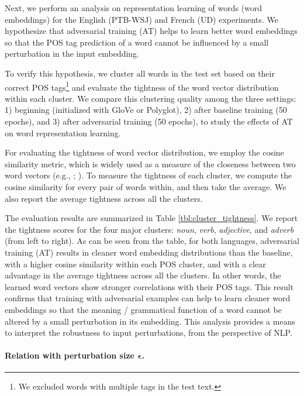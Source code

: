 \documentclass[11pt,a4paper]{article}
\begin{document}
Next, we perform an analysis on representation learning of words (word embeddings) for the English (PTB-WSJ) and French (UD) experiments.
We hypothesize that adversarial training (AT) helps to learn better word embeddings so that the POS tag prediction of a word cannot be influenced by a small perturbation in the input embedding.

To verify this hypothesis, 
we cluster all words in the test set based on their correct POS tags\footnote{We excluded words with multiple tags in the test text.}
and evaluate the tightness of the word vector distribution within each cluster. 
We compare this clustering quality among the three settings: 1) beginning (initialized with GloVe or Polyglot), 2) after baseline training (50 epochs), and 3) after adversarial training (50 epochs), to study the effects of AT on word representation learning.


For evaluating
the tightness of word vector distribution, we employ the
cosine similarity metric, which is widely used as a measure of the closeness between two word vectors
(e.g., ; ).
To measure the tightness of each cluster, we compute the cosine similarity for every pair of words within, and then take the average.
We also report the average tightness across all the clusters.




The evaluation results are summarized in Table \ref{tbl:cluster_tightness}.
We report the tightness scores for the four major clusters: {\it noun}, {\it verb}, {\it adjective}, and {\it adverb} (from left to right).
As can be seen from the table, for both languages, adversarial training (AT) results in cleaner word embedding distributions than the baseline, with a higher cosine similarity within each POS cluster, and with a clear advantage in the average tightness across all the clusters.
In other words, the learned word vectors show stronger correlations with their POS tags.
This result confirms that training with adversarial examples can help to learn cleaner word embeddings so that the meaning \!/\! grammatical function of a word cannot be altered by a small perturbation in its embedding.
This analysis provides a means to
interpret the robustness to input perturbations, from the perspective of NLP.



\paragraph{Relation with perturbation size $\boldsymbol{\epsilon}$.
}
\end{document}
